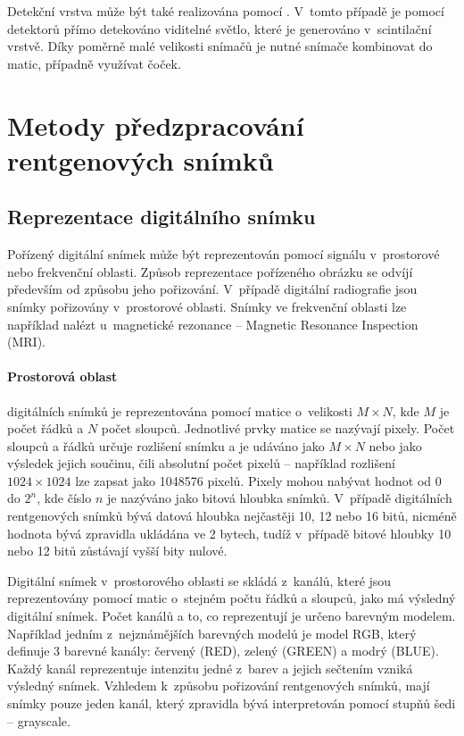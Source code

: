 Detekční vrstva může být také realizována pomocí . V~tomto případě je pomocí  detektorů přímo detekováno viditelné světlo, které je generováno v~scintilační vrstvě. Díky poměrně malé velikosti  snímačů je nutné snímače kombinovat do matic, případně využívat čoček.

\section{Metody předzpracování rentgenových snímků}

\subsection{Reprezentace digitálního snímku}
Pořízený digitální snímek může být reprezentován pomocí signálu v~prostorové nebo frekvenční oblasti. Způsob reprezentace pořízeného obrázku se odvíjí především od způsobu jeho pořizování. V~případě digitální radiografie jsou snímky pořizovány v~prostorové oblasti. Snímky ve frekvenční oblasti lze například nalézt u~magnetické rezonance -- Magnetic Resonance Inspection (MRI).

\paragraph{Prostorová oblast}
digitálních snímků je reprezentována pomocí matice o~velikosti $M \times N$, kde $M$ je počet řádků a $N$ počet sloupců. Jednotlivé prvky matice se nazývají pixely. Počet sloupců a řádků určuje rozlišení snímku a je udáváno jako $M \times N$ nebo jako výsledek jejich součinu, čili absolutní počet pixelů -- například rozlišení $1024 \times 1024$ lze zapsat jako \num{1048576} pixelů.  Pixely mohou nabývat hodnot od 0 do $2^{n}$, kde číslo $n$ je nazýváno jako bitová hloubka snímků. V~případě digitálních rentgenových snímků bývá datová hloubka nejčastěji 10, 12 nebo 16 bitů, nicméně hodnota bývá zpravidla ukládána ve 2 bytech, tudíž v~případě bitové hloubky 10 nebo 12 bitů zůstávají vyšší bity nulové.

Digitální snímek v~prostorového oblasti se skládá z~kanálů, které jsou reprezentovány pomocí matic o~stejném počtu řádků a sloupců, jako má výsledný digitální snímek. Počet kanálů a to, co reprezentují je určeno barevným modelem. Například jedním z~nejznámějších barevných modelů je model RGB, který definuje 3 barevné kanály: červený (RED), zelený (GREEN) a modrý (BLUE). Každý kanál reprezentuje intenzitu jedné z~barev a jejich sečtením vzniká výsledný snímek. Vzhledem k~způsobu pořizování rentgenových snímků, mají snímky pouze jeden kanál, který zpravidla bývá interpretován pomocí stupňů šedi -- grayscale.


